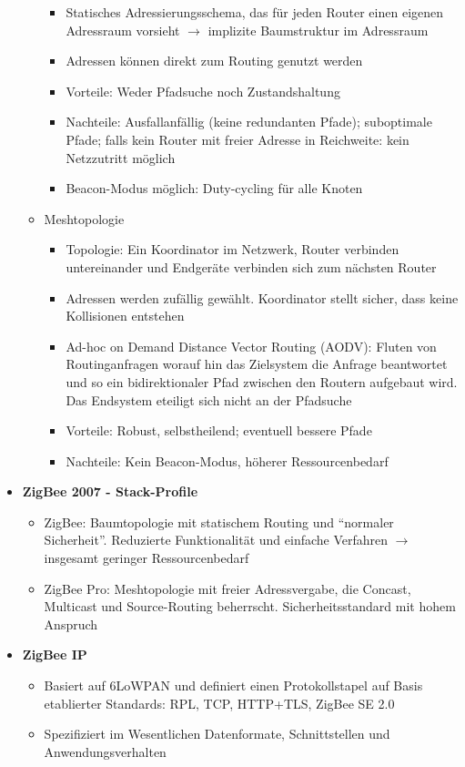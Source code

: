 \begin{itemize}
\begin{itemize}
\begin{itemize}
			\item Statisches Adressierungsschema, das für jeden Router einen eigenen Adressraum vorsieht \(\rightarrow\) implizite Baumstruktur im Adressraum
			\item Adressen können direkt zum Routing genutzt werden
			\item Vorteile: Weder Pfadsuche noch Zustandshaltung
			\item Nachteile: Ausfallanfällig (keine redundanten Pfade); suboptimale Pfade; falls kein Router mit freier Adresse in Reichweite: kein Netzzutritt möglich
			\item Beacon-Modus möglich: Duty-cycling für alle Knoten
		\end{itemize}
		\item Meshtopologie
		\begin{itemize}
			\item Topologie: Ein Koordinator im Netzwerk, Router verbinden untereinander und Endgeräte verbinden sich zum nächsten Router
			\item Adressen werden zufällig gewählt. Koordinator stellt sicher, dass keine Kollisionen entstehen
			\item Ad-hoc on Demand Distance Vector Routing (AODV): Fluten von Routinganfragen worauf hin das Zielsystem die Anfrage beantwortet und so ein bidirektionaler Pfad zwischen den Routern aufgebaut wird. Das Endsystem eteiligt sich nicht an der Pfadsuche
			\item Vorteile: Robust, selbstheilend; eventuell bessere Pfade
			\item Nachteile: Kein Beacon-Modus, höherer Ressourcenbedarf
		\end{itemize}
	\end{itemize}
	\item \textbf{ZigBee 2007 - Stack-Profile}
	\begin{itemize}
		\item ZigBee: Baumtopologie mit statischem Routing und "`normaler Sicherheit"'. Reduzierte Funktionalität und einfache Verfahren \(\rightarrow\) insgesamt geringer Ressourcenbedarf
		\item ZigBee Pro: Meshtopologie mit freier Adressvergabe, die Concast, Multicast und Source-Routing beherrscht. Sicherheitsstandard mit hohem Anspruch
	\end{itemize}
	\item \textbf{ZigBee IP}
	\begin{itemize}
		\item Basiert auf 6LoWPAN und definiert einen Protokollstapel auf Basis etablierter Standards: RPL, TCP, HTTP+TLS, ZigBee SE 2.0
		\item Spezifiziert im Wesentlichen Datenformate, Schnittstellen und Anwendungsverhalten
	\end{itemize}
\end{itemize}

